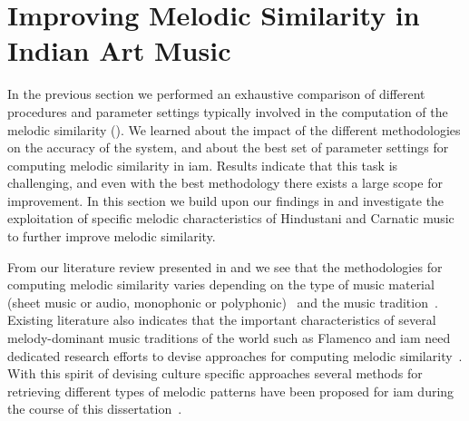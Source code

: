 
\section{Improving Melodic Similarity in Indian Art Music}
\label{sec:patterns_improving_melodic_similarity}

In the previous section we performed an exhaustive comparison of different procedures and parameter settings typically involved in the computation of the melodic similarity (). We learned about the impact of the different methodologies on the accuracy of the system, and about the best set of parameter settings for computing melodic similarity in \gls{iam}. Results indicate that this task is challenging, and even with the best methodology there exists a large scope for improvement. In this section we build upon our findings in  and investigate the exploitation of specific melodic characteristics of Hindustani and Carnatic music to further improve melodic similarity. 

From our literature review presented in  and  we see that the methodologies for computing melodic similarity varies depending on the type of music material (sheet music or audio, monophonic or polyphonic)~\citep{Marsden2012,meredith2002algorithms,Cambouropoulos2001,collins2014bridging,ghias1995query,dannenberg2007comparative,mazzoni2001melody} and the music tradition~\citep{Juhasz2009a, Conklin2010a,Lartillot2006,pikrakis2003recognition}. Existing literature also indicates that the important characteristics of several melody-dominant music traditions of the world such as Flamenco and \gls{iam} need dedicated research efforts to devise approaches for computing melodic similarity~\citep{gomez2012automatic,pikrakis2012tracking,pikrakis2016detection,Rao2014}. With this spirit of devising culture specific approaches several methods for retrieving different types of melodic patterns have been proposed for \gls{iam} during the course of this dissertation~\citep{Ross2012b,Ross2012,ishwar2012motivic,Rao2014,Ishwar2013,Dutta2014,dutta2014modified}. 

